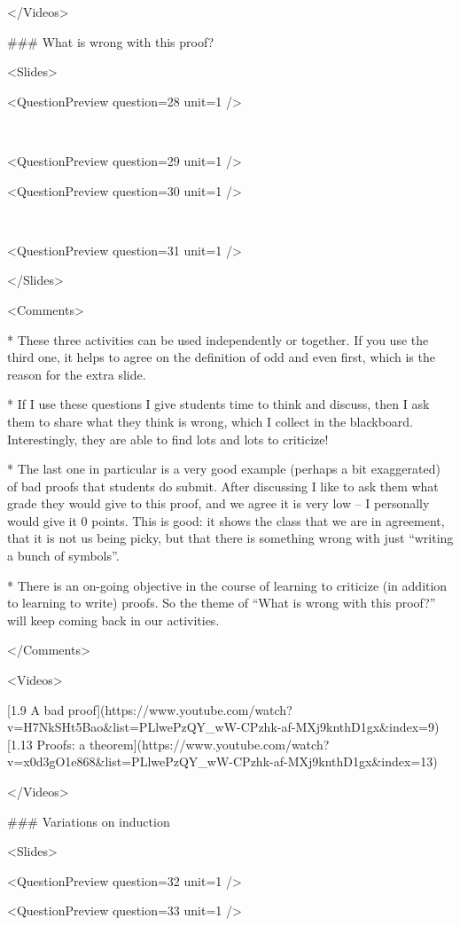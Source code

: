 </Videos>

### What is wrong with this proof?

<Slides>

<QuestionPreview question={28} unit={1} />

 

<QuestionPreview question={29} unit={1} />

<QuestionPreview question={30} unit={1} />

 

<QuestionPreview question={31} unit={1} />

</Slides>

<Comments>

*   These three activities can be used independently or together. If you use the third one, it helps to agree on the definition of odd and even first, which is the reason for the extra slide.

*   If I use these questions I give students time to think and discuss, then I ask them to share what they think is wrong, which I collect in the blackboard. Interestingly, they are able to find lots and lots to criticize!

*   The last one in particular is a very good example (perhaps a bit exaggerated) of bad proofs that students do submit. After discussing I like to ask them what grade they would give to this proof, and we agree it is very low – I personally would give it 0 points. This is good: it shows the class that we are in agreement, that it is not us being picky, but that there is something wrong with just “writing a bunch of symbols”.

*   There is an on-going objective in the course of learning to criticize (in addition to learning to write) proofs. So the theme of “What is wrong with this proof?” will keep coming back in our activities.

</Comments>

<Videos>

[1.9 A bad proof](https://www.youtube.com/watch?v=H7NkSHt5Bao\&list=PLlwePzQY_wW-CPzhk-af-MXj9knthD1gx\&index=9)[1.13 Proofs: a theorem](https://www.youtube.com/watch?v=x0d3gO1e868\&list=PLlwePzQY_wW-CPzhk-af-MXj9knthD1gx\&index=13)

</Videos>

### Variations on induction

<Slides>

<QuestionPreview question={32} unit={1} />

<QuestionPreview question={33} unit={1} />

